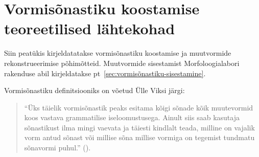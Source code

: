 \documentclass[12pt,a4paper]{article}
\begin{document}










\newpage
\section{Vormisõnastiku koostamise teoreetilised lähtekohad}

Siin peatükis kirjeldatatakse vormisõnastiku koostamise ja muutvormide rekonstrueerimise põhimõtteid. Muutvormide sisestamist Morfoloogialabori rakenduse abil kirjeldatakse pt~\ref{sec:vormisõnastiku-sisestamine}.

Vormisõnastiku definitsiooniks on võetud Ülle Viksi järgi:

\begin{quote}
  ``Üks täielik vormisõnastik peaks esitama kõigi sõnade kõik muutevormid koos vastava grammatilise iseloomustusega. Ainult siis saab kasutaja sõnastikust ilma mingi vaevata ja täiesti kindlalt teada, milline on vajalik vorm antud sõnast või millise sõna millise vormiga on tegemist tundmatu sõnavormi puhul.'' (\cite[7]{viks_vaike_1992}).
\end{quote}




\end{document}
